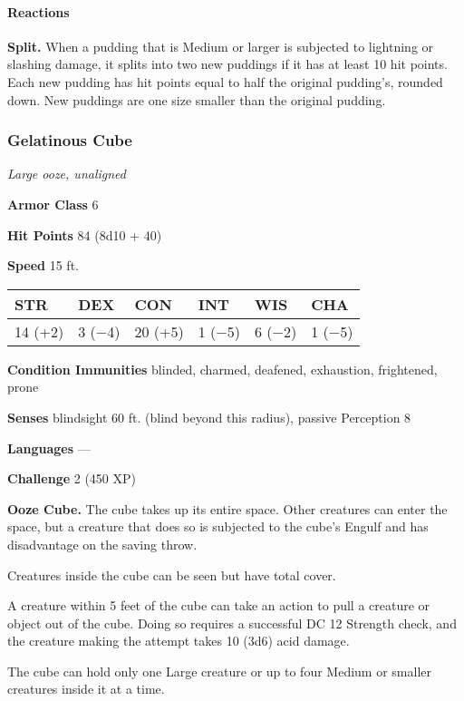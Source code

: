 \documentclass[
]{article}
\begin{document}
\hypertarget{reactions}{%
\paragraph{Reactions}\label{reactions}}

\textbf{Split.} When a pudding that is Medium or larger is subjected to
lightning or slashing damage, it splits into two new puddings if it has
at least 10 hit points. Each new pudding has hit points equal to half
the original pudding's, rounded down. New puddings are one size smaller
than the original pudding.

\hypertarget{gelatinous-cube}{%
\subsubsection{Gelatinous Cube}\label{gelatinous-cube}}

\emph{Large ooze, unaligned}

\textbf{Armor Class} 6

\textbf{Hit Points} 84 (8d10 + 40)

\textbf{Speed} 15 ft.

\begin{longtable}[]{@{}llllll@{}}
\toprule
STR & DEX & CON & INT & WIS & CHA\tabularnewline
\midrule
\endhead
14 (+2) & 3 (−4) & 20 (+5) & 1 (−5) & 6 (−2) & 1 (−5)\tabularnewline
\bottomrule
\end{longtable}

\textbf{Condition Immunities} blinded, charmed, deafened, exhaustion,
frightened, prone

\textbf{Senses} blindsight 60 ft. (blind beyond this radius), passive
Perception 8

\textbf{Languages} ---

\textbf{Challenge} 2 (450 XP)

\textbf{Ooze Cube.} The cube takes up its entire space. Other creatures
can enter the space, but a creature that does so is subjected to the
cube's Engulf and has disadvantage on the saving throw.

Creatures inside the cube can be seen but have total cover.

A creature within 5 feet of the cube can take an action to pull a
creature or object out of the cube. Doing so requires a successful DC 12
Strength check, and the creature making the attempt takes 10 (3d6) acid
damage.

The cube can hold only one Large creature or up to four Medium or
smaller creatures inside it at a time.
\end{document}

